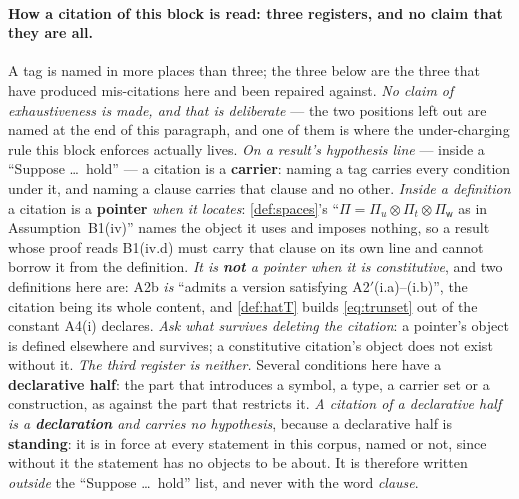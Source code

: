 \paragraph{How a citation of this block is read: three registers, and no claim that they are all.}
A tag is named in more places than three; the three below are the three that have produced mis-citations
here and been repaired against. \emph{No claim of exhaustiveness is made, and that is deliberate} --- the
two positions left out are named at the end of this paragraph, and one of them is where the
under-charging rule this block enforces actually lives.
\emph{On a result's hypothesis line} --- inside a ``Suppose \dots\ hold'' --- a citation is a
\textbf{carrier}: naming a tag carries every condition under it, and naming a clause carries that clause
and no other. \emph{Inside a definition} a citation is a \textbf{pointer} \emph{when it locates}:
\cref{def:spaces}'s ``$\Pi=\Pi_u\otimes\Pi_t\otimes\Pi_{\mathsf w}$ as in Assumption~B1(iv)'' names the
object it uses and imposes nothing, so a result whose proof reads B1(iv.d) must carry that clause on its
own line and cannot borrow it from the definition. \emph{It is \textbf{not} a pointer when it is
constitutive}, and two definitions here are: A2b \emph{is} ``admits a version satisfying
A2$'$(i.a)--(i.b)'', the citation being its whole content, and \cref{def:hatT} builds
\eqref{eq:trunset} out of the constant A4(i) declares. \emph{Ask what survives deleting the citation}: a
pointer's object is defined elsewhere and survives; a constitutive citation's object does not exist
without it. \emph{The third register is neither.} Several conditions here have a \textbf{declarative
half}: the part that introduces a symbol, a type, a carrier set or a construction, as against the part
that restricts it.
\emph{A citation of a declarative half is a \textbf{declaration} and carries no hypothesis}, because a
declarative half is \textbf{standing}: it is in force at every statement in this corpus, named or not,
since without it the statement has no objects to be about. It is therefore written \emph{outside} the
``Suppose \dots\ hold'' list, and never with the word \emph{clause}.


